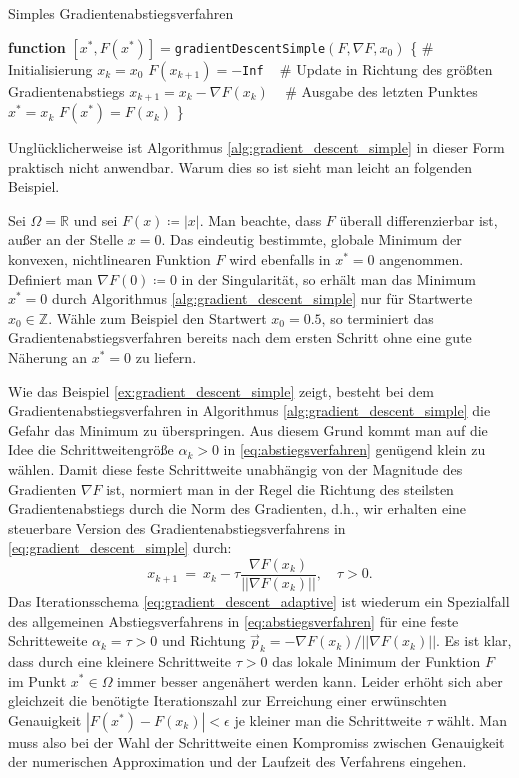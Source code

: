 \begin{algorithm}{Simples Gradientenabstiegsverfahren}{}
\label{alg:gradient_descent_simple}
\begin{algorithmic}
\STATE \textbf{function} $[x^*, F(x^*)]= $\texttt{gradientDescentSimple}$(F,\nabla F, x_0)$ \{
\STATE \# Initialisierung
\STATE $x_k = x_0$
\STATE $F(x_{k+1}) = -$\texttt{Inf}
\STATE ~
\STATE \# Update in Richtung des größten Gradientenabstiegs
\STATE $x_{k+1} = x_k - \nabla F(x_k)$
\ENDWHILE
\STATE ~
\STATE \# Ausgabe des letzten Punktes
\STATE $x^* = x_k$
\STATE $F(x^*) = F(x_k)$
\STATE \}
\end{algorithmic}
\end{algorithm}
Unglücklicherweise ist Algorithmus \ref{alg:gradient_descent_simple} in dieser Form praktisch nicht anwendbar. Warum dies so ist sieht man leicht an folgenden Beispiel.
\begin{example}{}{}
\label{ex:gradient_descent_simple}
Sei $\Omega = \mathbb{R}$ und sei $F(x) \coloneqq |x|$. 
Man beachte, dass $F$ überall differenzierbar ist, außer an der Stelle $x=0$. Das eindeutig bestimmte, globale Minimum der konvexen, nichtlinearen Funktion $F$ wird ebenfalls in $x^* = 0$ angenommen. 
Definiert man $\nabla F(0) \coloneqq 0$ in der Singularität, so erhält man das Minimum $x^* = 0$ durch Algorithmus \ref{alg:gradient_descent_simple} nur für Startwerte $x_0 \in \mathbb{Z}$. 
Wähle zum Beispiel den Startwert $x_0 = 0.5$, so terminiert das Gradientenabstiegsverfahren bereits nach dem ersten Schritt ohne eine gute Näherung an $x^* = 0$ zu liefern.
\end{example}
Wie das Beispiel \ref{ex:gradient_descent_simple} zeigt, besteht bei dem Gradientenabstiegsverfahren in Algorithmus \ref{alg:gradient_descent_simple} die Gefahr das Minimum zu überspringen. 
Aus diesem Grund kommt man auf die Idee die Schrittweitengröße $\alpha_k > 0$ in \eqref{eq:abstiegsverfahren} genügend klein zu wählen.
Damit diese feste Schrittweite unabhängig von der Magnitude des Gradienten $\nabla F$ ist, normiert man in der Regel die Richtung des steilsten Gradientenabstiegs durch die Norm des Gradienten, d.h., wir erhalten eine steuerbare Version des Gradientenabstiegsverfahrens in \eqref{eq:gradient_descent_simple} durch:
\begin{equation}
\label{eq:gradient_descent_control}
x_{k+1} \ = \ x_k - \tau \frac{\nabla F(x_k)}{||\nabla F(x_k)||}, \quad \tau > 0 .
\end{equation}
Das Iterationsschema \eqref{eq:gradient_descent_adaptive} ist wiederum ein Spezialfall des allgemeinen Abstiegsverfahrens in \eqref{eq:abstiegsverfahren} für eine feste Schritteweite $\alpha_k = \tau > 0$ und Richtung $\vec{p}_k = -\nabla F(x_k) / ||\nabla F(x_k)||$.
Es ist klar, dass durch eine kleinere Schrittweite $\tau > 0$ das lokale Minimum der Funktion $F$ im Punkt $x^* \in \Omega$ immer besser angenähert werden kann. 
Leider erhöht sich aber gleichzeit die benötigte Iterationszahl zur Erreichung einer erwünschten Genauigkeit $|F(x^*) - F(x_k)| < \epsilon$ je kleiner man die Schrittweite $\tau$ wählt.
Man muss also bei der Wahl der Schrittweite einen Kompromiss zwischen Genauigkeit der numerischen Approximation und der Laufzeit des Verfahrens eingehen.

